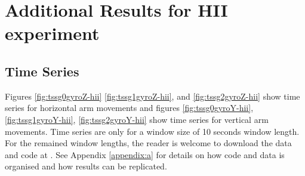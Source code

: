 \chapter{Additional Results for HII experiment} \label{appendix:e}


\graphicspath{{figs/appendixE/PDF/}}

\section{Time Series} \label{appendix:e:ts}
Figures \ref{fig:tssg0gyroZ-hii} \ref{fig:tssg1gyroZ-hii}, and \ref{fig:tssg2gyroZ-hii}
show time series for horizontal arm movements 
and figures \ref{fig:tssg0gyroY-hii}, \ref{fig:tssg1gyroY-hii},
\ref{fig:tssg2gyroY-hii}
show time series for vertical arm movements.
Time series are only for a window size of 10 seconds window length.
For the remained window lengths, 
the reader is welcome to download the data and code at \cite{xochicale2018}.
See Appendix \ref{appendix:a}
for details on how code and data 
is organised and how results can be replicated. 


